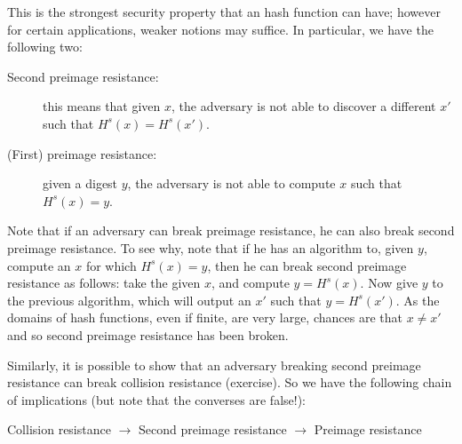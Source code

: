   \bigskip

  \noindent This is the strongest security property that an hash function can have; however for certain applications, weaker notions may suffice. In particular, we have the following two:
  \begin{description}
    \item[Second preimage resistance:] this means that given $x$, the adversary is not able to discover a different $x'$ such that $H^s(x) = H^s(x')$.
    \item[(First) preimage resistance:] given a digest $y$, the adversary is not able to compute $x$ such that $H^s(x) = y$.
  \end{description}
  Note that if an adversary can break preimage resistance, he can also break second preimage resistance. To see why, note that if he has an algorithm to, given $y$, compute an $x$ for which $H^s(x) = y$, then he can break second preimage resistance as follows: take the given $x$, and compute $y=H^s(x)$. Now give $y$ to the previous algorithm, which will output an $x'$ such that $y=H^s(x')$. As the domains of hash functions, even if finite, are very large, chances are that $x\neq x'$\emd and so second preimage resistance has been broken.

  Similarly, it is possible to show that an adversary breaking second preimage resistance can break collision resistance (exercise). So we have the following chain of implications (but note that the converses are false!):
  \begin{center}
    Collision resistance $\rightarrow$ Second preimage resistance $\rightarrow$ Preimage resistance
  \end{center}

